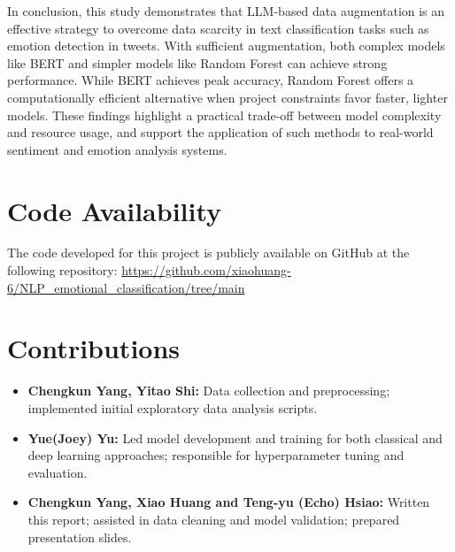 \documentclass{article}
\begin{document}
In conclusion, this study demonstrates that LLM-based data augmentation is an effective strategy to overcome data scarcity in text classification tasks such as emotion detection in tweets. With sufficient augmentation, both complex models like BERT and simpler models like Random Forest can achieve strong performance. While BERT achieves peak accuracy, Random Forest offers a computationally efficient alternative when project constraints favor faster, lighter models. These findings highlight a practical trade-off between model complexity and resource usage, and support the application of such methods to real-world sentiment and emotion analysis systems.
 

\section{Code Availability}
The code developed for this project is publicly available on GitHub at the following repository:
\url{https://github.com/xiaohuang-6/NLP_emotional_classification/tree/main}


\section{Contributions}
\begin{itemize}
    \item \textbf{Chengkun Yang, Yitao Shi:} Data collection and preprocessing; implemented initial exploratory data analysis scripts.
    \item \textbf{Yue(Joey) Yu:} Led model development and training for both classical and deep learning approaches; responsible for hyperparameter tuning and evaluation.
    \item \textbf{Chengkun Yang, Xiao Huang and Teng-yu (Echo) Hsiao:} Written this report; assisted in data cleaning and model validation; prepared presentation slides.
\end{itemize}

\newpage



\end{document}
